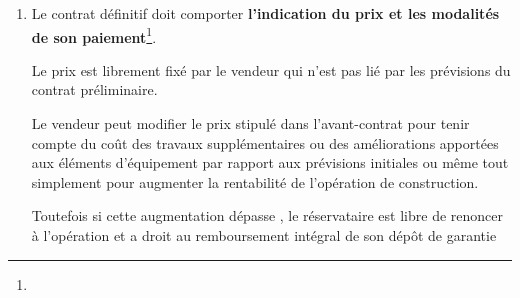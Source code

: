 \begin{enumerate}
					La description de l’immeuble au stade du contrat définitif doit être plus complète que celle contenue dans le contrat préliminaire.

					Elle doit comprendre\footnote{} :
					\begin{itemize}
						\item des plans de l'immeuble vendu, coupes et élévations avec les cotes utiles et l'indication des surfaces de chacune des pièces et des dégagements (1\ier{} alinéa) ;

						\item si l’immeuble est compris dans un ensemble immobilier, un plan faisant apparaître le nombre de bâtiments de cet ensemble, leur emplacement et le nombre d'étages de chacun d'eux (2\ieme{} alinéa) ;

						\item une notice descriptive précisant les caractéristiques techniques du bien --- la notice doit être conforme à un modèle type agréé par arrêté ministériel\footnote{Arrêté du 10 mai 1968, Journal Officiel 29 Juin 1968} ---  les 4\ieme{}et 5\ieme{} alinéas précisant que :

						« {\itshape Ces documents s'appliquent au local vendu, à la partie de bâtiment ou au bâtiment dans lequel il se trouve et aux équipements extérieurs et réseaux divers qui s'y rapportent.

						Un plan coté du local vendu et une notice indiquant les éléments d'équipement propres à ce local doivent être annexés au contrat de vente }».
					\end{itemize}


					\item Le contrat définitif doit comporter \textbf{l'indication du prix et les modalités de son paiement}\footnote{}.

					Le prix est librement fixé par le vendeur qui n'est pas lié par les prévisions du contrat préliminaire.

					Le vendeur peut modifier le prix stipulé dans l’avant-contrat pour tenir compte du coût des travaux supplémentaires ou des améliorations apportées aux éléments d'équipement par rapport aux prévisions initiales ou même tout simplement pour augmenter la rentabilité de l'opération de construction.

					Toutefois si cette augmentation dépasse , le réservataire est libre de renoncer à l'opération et a droit au remboursement intégral de son dépôt de garantie


\end{enumerate}
